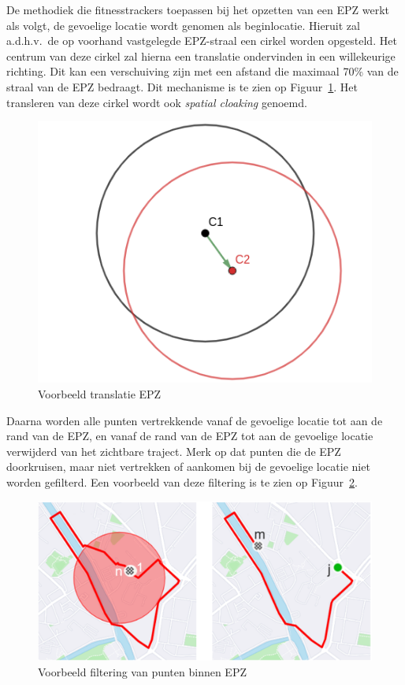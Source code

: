 De methodiek die fitnesstrackers toepassen bij het opzetten van een \ac{EPZ}
werkt als volgt, de gevoelige locatie wordt genomen als beginlocatie. Hieruit
zal a.d.h.v.\ de op voorhand vastgelegde \ac{EPZ}-straal een cirkel worden
opgesteld. Het centrum van deze cirkel zal hierna een translatie ondervinden in
een willekeurige richting. Dit kan een verschuiving zijn met een afstand die
maximaal 70\% van de straal van de \ac{EPZ} bedraagt. Dit mechanisme is te zien
op Figuur~\ref{fig:translation}. Het transleren van deze cirkel wordt ook
\textit{spatial cloaking} genoemd.
\begin{figure}[h]
    \centering
    \includegraphics[width=0.4\linewidth]{fig/EPZ-mechanisme/Translation_Center.png}
    \caption{Voorbeeld translatie EPZ}\label{fig:translation}
\end{figure}

Daarna worden alle punten vertrekkende vanaf de gevoelige locatie tot aan de
rand van de \ac{EPZ}, en vanaf de rand van de \ac{EPZ} tot aan de gevoelige
locatie verwijderd van het zichtbare traject. Merk op dat punten die de
\ac{EPZ} doorkruisen, maar niet vertrekken of aankomen bij de gevoelige locatie
niet worden gefilterd. Een voorbeeld van deze filtering is te zien op
Figuur~\ref{fig:drop points}.
\begin{figure}[h]
    \centering
    \includegraphics[width=0.7\linewidth]{fig/EPZ-mechanisme/DropEPZPoints.png}
    \caption{Voorbeeld filtering van punten binnen \ac{EPZ}~\cite{Dhondt}}\label{fig:drop points}
\end{figure}

